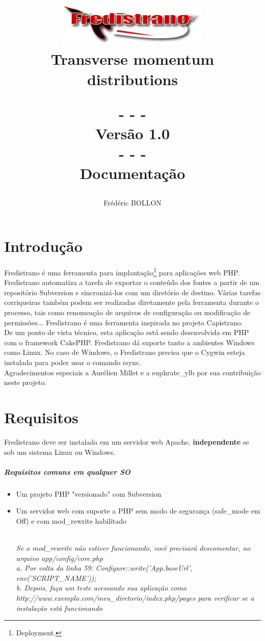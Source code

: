 \documentclass[12pt,a4paper]{report}
\author{Frédéric BOLLON}
\title{
    \begin{figure}[htp]
    \centering
    \includegraphics{doc_fredistrano2.png}
    \caption{Transverse momentum distributions}\label{fig:erptsqfit}
    \end{figure}
    - - -\\Versão 1.0\\- - -\\Documentação\\
}
\begin{document}
\maketitle
\tableofcontents

\chapter{Introdução}
Fredistrano é uma ferramenta para implantação\footnote{Deployment.} para aplicações web PHP.  Fredistrano automatiza a tarefa de exportar o conteúdo dos fontes a partir de um repositório Subversion e sincronizá-los com um diretório de destino.  Várias tarefas corriqueiras também podem ser realizadas diretamente pela ferramenta durante o processo, tais como renomeação de arquivos de configuração ou modificação de permissões...  Fredistrano é uma ferramenta inspirada no projeto Capistrano.\\

De um ponto de vista técnico, esta aplicação está sendo desenvolvida em PHP com o framework CakePHP.  Fredistrano dá suporte tanto a ambientes Windows como Linux.
No caso de Windows, o Fredistrano precisa que o Cygwin esteja instalada para poder usar o comando rsync.\\

Agradecimentos especiais a Aurélien Millet e a euphrate\_ylb por sua contribuição neste projeto.

\chapter{Requisitos}
Fredistrano deve ser instalada em um servidor web Apache, \textbf{independente} se sob um sistema Linux ou Windows.
\paragraph*{Requisitos comuns em qualquer SO}
\begin{itemize}
\item 
Um projeto PHP "versionado" com Subversion
\item 
Um servidor web com suporte a PHP sem modo de segurança (safe\_mode em Off) e com mod\_rewrite habilitado\\\\
\begin{small}\textit{Se o mod\_rewrite não estiver funcionando, você precisará descomentar, no arquivo app/config/core.php\\
      a. Por volta da linha 59: Configure::write('App.baseUrl', env('SCRIPT\_NAME'));\\
      b. Depois, faça um teste acessando sua aplicação como http://www.exemplo.com/meu\_diretorio/index.php/pages para verificar se a instalação está funcionando}\end{small}
\end{itemize}
\end{document}

